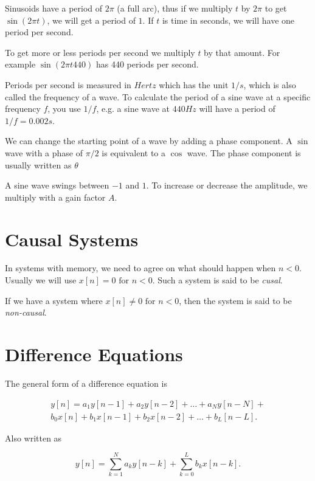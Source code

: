 \documentclass[openany]{book}
\def\lsqb{\left[}
\def\rsqb{\right]}
\def\sqb#1{\lsqb #1 \rsqb}
\begin{document}
Sinusoids have a period of $2 \pi$ (a full arc), thus if we multiply $t$ by $2\pi$ to get $\sin(2 \pi t)$, we will get a period of $1$. If $t$ is time in seconds, we will have one period per second.

To get more or less periods per second we multiply $t$ by that amount. For example $\sin(2 \pi t 440)$ has 440 periods per second.

Periods per second is measured in $Hertz$ which has the unit $1/s$, which is also called the frequency of a wave. To calculate the period of a sine wave at a specific frequency $f$, you use $1/f$, e.g. a sine wave at $440Hz$ will have a period of $1/f=0.002s$.

We can change the starting point of a wave by adding a phase component. A $\sin$ wave with a phase of $\pi/2$ is equivalent to a $\cos$ wave. The phase component is usually written as $\theta$

A sine wave swings between $-1$ and $1$. To increase or decrease the amplitude, we multiply with a gain factor $A$.

\section{Causal Systems}
In systems with memory, we need to agree on what should happen when $n < 0$. Usually we will use $x\left[n\right] = 0 \text{ for } n < 0$. Such a system is said to be \textit{cusal}.

If we have a system where $x\left[n\right] \neq 0 \text{ for } n < 0$, then the system is said to be \textit{non-causal}.

\section{Difference Equations}
The general form of a difference equation is

\begin{equation}
\begin{split}
    y\sqb{n} = a_1 y\sqb{n - 1} + a_2 y\sqb{n-2} + \dots + a_N y\sqb{n-N} + \\
        b_0 x\sqb{n} + b_1 x\sqb{n - 1} + b_2 x\sqb{n - 2} + \dots + b_L\sqb{n - L}.
\end{split}
\end{equation}

Also written as

\begin{equation}
    y\sqb{n} = \sum_{k=1}^N a_k y\sqb{n - k} + \sum_{k=0}^L b_k x\sqb{n - k}.
\end{equation}
\end{document}
